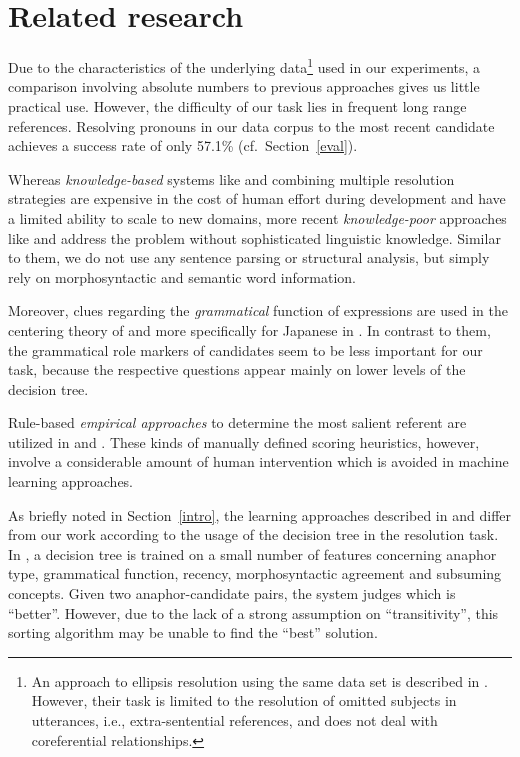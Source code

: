 \section{Related research}
\label{relr}

Due to the characteristics of the underlying data\footnote{An approach to ellipsis resolution using the same data set is described in \cite{Yamamoto98}. However, their task is limited to the resolution of omitted subjects in utterances, i.e., extra-sentential references, and does not deal with coreferential relationships.}
used in our experiments, a comparison involving absolute numbers to previous
approaches gives us little practical use.
However, the difficulty of our task lies in frequent long range references.
Resolving pronouns in our data corpus to the most recent candidate achieves
a success rate of only 57.1\% (cf.~Section~\ref{eval}).

Whereas {\em knowledge-based} systems like \cite{Carbonell88} and \cite{Rich88} combining
multiple resolution strategies are expensive in the cost of human effort during development
and have a limited ability to scale to new domains, more recent {\em knowledge-poor} approaches
like \cite{Kennedy96} and \cite{Mitkov98} address the problem without sophisticated
linguistic knowledge.
Similar to them, we do not use any sentence parsing or structural analysis, but simply rely
on morphosyntactic and semantic word information.

Moreover, clues regarding the {\em grammatical} function of expressions are used in 
the centering theory of \cite{Grosz95} and more specifically for Japanese in
\cite{Walker94}. In contrast to them, the grammatical role markers of candidates
seem to be less important for our task, because the respective questions appear
mainly on lower levels of the decision tree.

Rule-based {\em empirical approaches} to determine the most salient referent are utilized
in \cite{Nakaiwa96} and \cite{Murata97}. These kinds of manually defined scoring heuristics,
however, involve a considerable amount of human intervention which is avoided
in machine learning approaches.

As briefly noted in Section~\ref{intro}, the learning approaches described
in \cite{Conolly94} and \cite{Aone95} differ from our work
according to the usage of the decision tree in the resolution task.
In \cite{Conolly94}, a decision tree is trained on a small number of features
concerning anaphor type, grammatical function, recency, morphosyntactic agreement
and subsuming concepts. Given two anaphor-candidate pairs, the system judges which is
``better''. However, due to the lack of a strong assumption on ``transitivity'',
this sorting algorithm may be unable to find the ``best'' solution.

